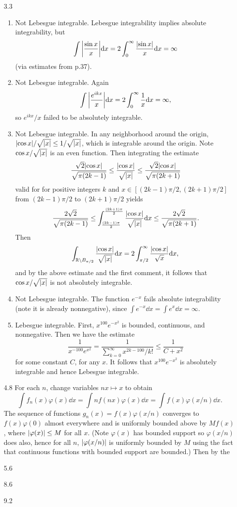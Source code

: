 \documentclass[11pt]{article}
\begin{document}
\begin{enumerate}
    \item[3.3] \begin{enumerate}
        \item Not Lebesgue integrable. Lebesgue integrability implies absolute integrability, but \[\int \abs{\frac{\sin x}{x}}\dd x = 2\int_0^\infty \frac{\abs{\sin x}}{x}\dd x = \infty\] (via estimates from p.37).
        \item Not Lebesgue integrable. Again \[\int \abs{\frac{e^{ikx}}{x}}\dd x = 2\int_0^\infty \frac{1}{x}\dd x=\infty ,\] so $e^{ikx}/x$ failed to be absolutely integrable.
        \item Not Lebesgue integrable. In any neighborhood around the origin, $\abs{ \cos x}/\sqrt{\abs{x}}\leq 1/\sqrt{\abs{x}}$, which is integrable around the origin. Note $\cos x/\sqrt{\abs{x}}$ is an even function. Then integrating the estimate \[\frac{\sqrt 2\abs{\cos x}}{\sqrt{\pi(2k-1)}}\leq \frac{\abs{\cos x}}{\sqrt{\abs{x}}}\leq \frac{\sqrt 2\abs{\cos x}}{\sqrt{\pi(2k+1)}}\] valid for for positive integers $k$ and $x\in [(2k-1)\pi/2,(2k+1)\pi/2]$ from $(2k-1)\pi/2$ to $(2k+1)\pi/2$ yields \[\frac{2\sqrt 2}{\sqrt{\pi(2k-1)}}\leq \int_{\frac{(2k-1)\pi}{2}}^{\frac{(2k+1)\pi}{2}}\frac{\abs{\cos x}}{\sqrt{\abs{x}}}\dd x\leq \frac{2\sqrt 2}{\sqrt{\pi(2k+1)}}.\] Then \[\int_{\mathbb{R}\setminus B_{\pi/2}} \frac{\abs{\cos x}}{\sqrt{\abs{x}}}\dd x = 2\int_{\pi/2}^\infty \frac{\abs{\cos x}}{\sqrt{x}}\dd x,\] and by the above estimate and the first comment, it follows that $\cos x /\sqrt{\abs{x}}$ is not absolutely integrable.
        \item Not Lebesgue integrable. The function $e^{-x}$ fails absolute integrability (note it is already nonnegative), since $\int e^{-x}\dd x = \int e^x \dd x = \infty$.
        \item Lebesgue integrable. First, $x^{100}e^{-x^2}$ is bounded, continuous, and nonnegative. Then we have the estimate \[\frac{1}{x^{-100}e^{x^2}} = \frac{1}{\sum_{k=0}^\infty x^{2k-100}/k!}\leq \frac{1}{C+x^2}\] for some constant $C$, for any $x$. It follows that $x^{100}e^{-x^2}$ is absolutely integrable and hence Lebesgue integrable.
    \end{enumerate}
    \item[4.8] For each $n$, change variables $nx\mapsto x$ to obtain \[\int f_n(x)\varphi(x)\dd x = \int nf(nx)\varphi(x)\dd x = \int f(x)\varphi(x/n)\dd x.\] The sequence of functions $g_n(x) = f(x)\varphi(x/n)$ converges to $f(x)\varphi(0)$ almost everywhere and is uniformly bounded above by $Mf(x)$, where $\abs{\varphi(x)}\leq M$ for all $x$. (Note $\varphi(x)$ has bounded support so $\varphi(x/n)$ does also, hence for all $n$, $\abs{\varphi(x/n)}$ is uniformly bounded by $M$ using the fact that continuous functions with bounded support are bounded.) Then by the 
    \item[5.6]
    \item[8.6]
    \item[9.2]
\end{enumerate}
\vspace*{7em}
\end{document}
